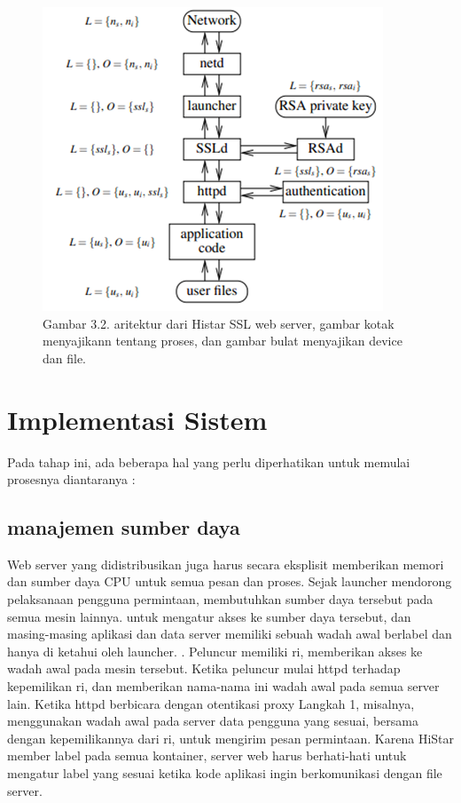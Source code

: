 \documentclass{jtetiproposalskripsi}
\begin{document}
\begin{figure}[ht!]
  \centering
    \includegraphics{gambar/arsitektur}
    \caption{Gambar 3.2. aritektur dari Histar SSL web server, gambar kotak menyajikann tentang proses, dan gambar bulat menyajikan device dan file.}
    \label{star}
\end{figure}

\section{Implementasi Sistem}
Pada tahap ini, ada beberapa hal yang perlu diperhatikan untuk memulai prosesnya diantaranya :
\subsection{manajemen sumber daya}
Web server yang didistribusikan juga harus secara eksplisit memberikan memori dan sumber daya CPU untuk semua pesan dan proses. Sejak launcher mendorong pelaksanaan pengguna permintaan, membutuhkan sumber daya tersebut pada semua mesin lainnya. untuk mengatur akses ke sumber daya tersebut, dan masing-masing aplikasi dan data server memiliki sebuah wadah awal berlabel  dan hanya di ketahui oleh launcher. . Peluncur memiliki ri, memberikan akses ke wadah awal pada mesin tersebut. Ketika peluncur mulai httpd terhadap kepemilikan ri, dan memberikan nama-nama ini wadah awal pada semua server lain. Ketika httpd berbicara dengan otentikasi proxy Langkah 1, misalnya, menggunakan wadah awal pada server data pengguna yang sesuai, bersama dengan kepemilikannya dari ri, untuk mengirim pesan permintaan. Karena HiStar member label pada  semua kontainer, server web harus berhati-hati untuk mengatur label yang sesuai ketika kode aplikasi ingin berkomunikasi dengan file server.
\end{document}
